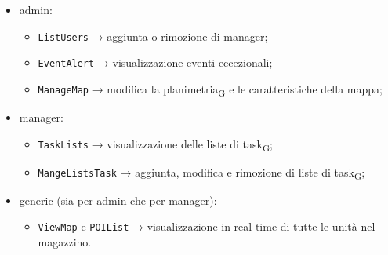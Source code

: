 \begin{itemize}
	\item admin:
	\begin{itemize}
		\item \texttt{ListUsers} → aggiunta o rimozione di manager;
		\item \texttt{EventAlert} → visualizzazione eventi eccezionali;
		\item \texttt{ManageMap} → modifica la planimetria\textsubscript{G} e le caratteristiche della mappa;
	\end{itemize}
	\item manager:
	\begin{itemize}
		\item \texttt{TaskLists} → visualizzazione delle liste di task\textsubscript{G};
		\item \texttt{MangeListsTask} → aggiunta, modifica e rimozione di liste di task\textsubscript{G};
	\end{itemize}
	\item generic (sia per admin che per manager):
	\begin{itemize}
		\item \texttt{ViewMap} e \texttt{POIList} → visualizzazione in real time di tutte le unità nel magazzino.
	\end{itemize}
\end{itemize}



